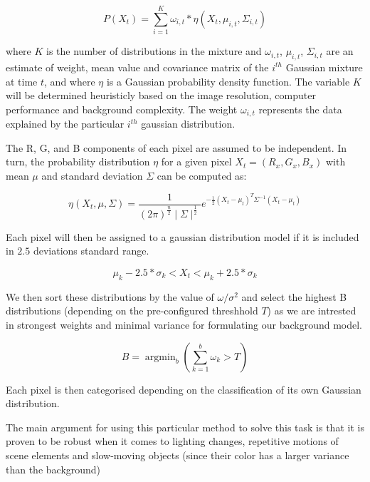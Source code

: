 \begin{equation}
P(X_t) = \sum_{i=1}^{K} \omega_{i,t} \ast \eta(X_{t},\mu_{i,t},\Sigma_{i,t})
\end{equation}  

where $K$ is the number of distributions in the mixture and $\omega_{i,t}$, $\mu_{i,t}$, $\Sigma_{i,t}$ are an estimate of weight, mean value and covariance matrix of the $i^{th}$ Gaussian mixture at time $t$, and where $\eta$ is a Gaussian probability density function. The variable $K$ will be determined heuristicly based on the image  resolution, computer performance and background complexity. The weight $\omega_{i,t}$ represents the data explained by the particular $i^{th}$ gaussian distribution. 

The R, G, and B components of each pixel are assumed to be independent. In turn, the probability distribution $\eta$ for a given pixel $X_t = (R_x, G_x, B_x)$ with mean $\mu$ and standard deviation $\Sigma$ can be computed as:

\begin{equation}
\eta(X_t,\mu,\Sigma) = \frac{1}{(2\pi)^{\frac{n}{2}} \mid\Sigma\mid ^{\frac{1}{2}}} e^{-\frac{1}{2}(X_{t}-\mu_{t})^{T}\Sigma^{-1}(X_{t}-\mu_{t})}
\end{equation}

Each pixel will then be assigned to a gaussian distribution model if it is included in $2.5$ deviations standard range.

\begin{equation}
\mu_{k}-2.5 * \sigma_{k}<X_{t}<\mu_{k}+2.5 * \sigma_{k}
\end{equation}

We then sort these distributions by the value of $\omega / \sigma^2$ and select the highest B distributions (depending on the pre-configured threshhold $T$) as we are intrested in strongest weights and minimal variance for formulating our background model.  

\begin{equation}
B=\operatorname{argmin}_{b}\left(\sum_{k=1}^{b} \omega_{k}>T\right)
\end{equation}

Each pixel is then categorised depending on the classification of its own Gaussian distribution.

\medskip

The main argument for using this particular method to solve this task is that it is proven to be robust when it comes to lighting changes, repetitive motions of scene elements and slow-moving objects (since their color has a larger variance than the background)